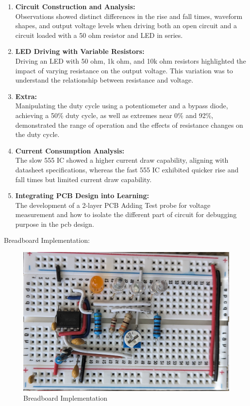 \documentclass[a4paper,11pt]{article}%
\begin{document}
\begin{enumerate}
	\item \textbf{Circuit Construction and Analysis:}\\
	Observations showed distinct differences in the rise and fall times, waveform shapes, and output voltage levels when driving both an open circuit and a circuit loaded with a 50 ohm resistor and LED in series.
	\item \textbf{LED Driving with Variable Resistors:}\\
	Driving an LED with 50 ohm, 1k ohm, and 10k ohm resistors highlighted the impact of varying resistance on the output voltage. This variation was to understand the relationship between resistance and voltage.
	\item \textbf{Extra:} \\
	Manipulating the duty cycle using a potentiometer and a bypass diode, achieving a 50\% duty cycle, as well as extremes near 0\% and 92\%, demonstrated the range of operation and the effects of resistance changes on the duty cycle. 
	\item \textbf{Current Consumption Analysis:}\\
	The slow 555 IC showed a higher current draw capability, aligning with datasheet specifications, whereas the fast 555 IC exhibited quicker rise and fall times but limited current draw capability.
	\item \textbf{Integrating PCB Design into Learning:}\\
	The development of a 2-layer PCB Adding Test probe for voltage measurement and how to isolate the different part of circuit for debugging purpose in the pcb design.
   
\end{enumerate}

Breadboard Implementation:

\begin{figure}[H]
	\centering
	\includegraphics[scale=0.2]{figures/breadboard.jpg}
	\caption{Breadboard Implementation}
	\label{breadboard}
\end{figure}
\end{document}
